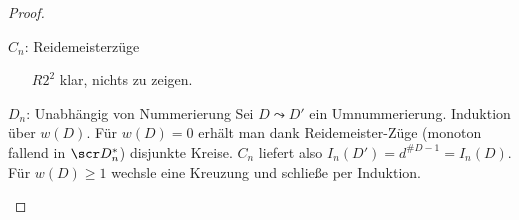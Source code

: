 \begin{st}[HOMPFLYPT]
\begin{proof}
\begin{seg}{$C_n$: Reidemeisterzüge}
\begin{enumerate}[(R1)]
                    Nun ergibt sich
                    \begin{math}
                        a^2 I_n( R_{++,+}) - b^2 I_n(R_{--,+}) &= b c I_{n-1}(R_{-0,+}) + ac I_{n-1}(R_{0+,+}) \\
                        a^2 I_n( R_{+,++}) - b^2 I_n(R_{+,--}) &= b c I_{n-1}(R_{+,0-}) + ac I_{n-1}(R_{+,+0}) \\
                    \end{math}
                    Dank R2 ist $I_n(R_{-0,+}) = I_n(R_{+,0-})$.
                    Auf der linken Seite ergeben sich eine Äquivalenz, mit der wir alle Stränge permutieren können.
                    Für eine Permutation ist die R3-Invarianz klar, damit auch für alle anderen.

                    Ebenso für die zweite Orientierung von $i$:
                    Auch $i = j < k$ und andere Fälle verlaufen analog oder leichter.
                \item[$R2^2$]
                    klar, nichts zu zeigen.
            \end{enumerate}
        \end{seg}
        \begin{seg}{$D_n$: Unabhängig von Nummerierung}
            Sei $D \leadsto D'$ ein Umnummerierung.
            Induktion über $w(D)$.
            Für $w(D) = 0$ erhält man dank Reidemeister-Züge (monoton fallend in $\scr D_n^*$) disjunkte Kreise.
            $C_n$ liefert also $I_n(D') = d^{\# D - 1} = I_n(D)$.
            Für $w(D) \ge 1$ wechsle eine Kreuzung und schließe per Induktion.
        \end{seg}
    \end{proof}
\end{st}


